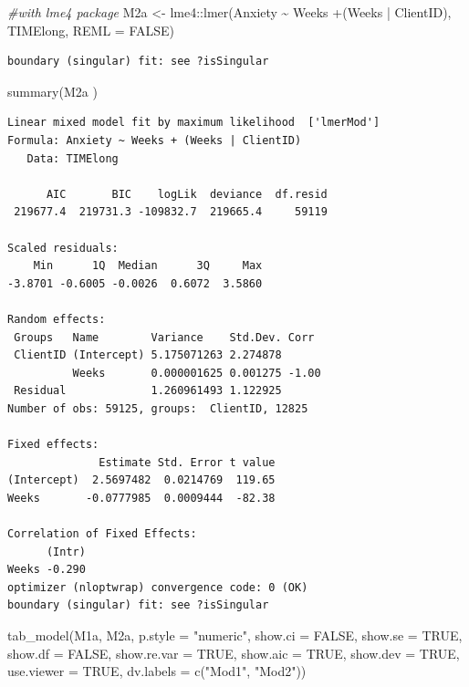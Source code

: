 \documentclass[
  english,
]{book}
\newenvironment{Shaded}{\begin{snugshade}}{\end{snugshade}}
\newcommand{\AttributeTok}[1]{\textcolor[rgb]{0.77,0.63,0.00}{#1}}
\newcommand{\CommentTok}[1]{\textcolor[rgb]{0.56,0.35,0.01}{\textit{#1}}}
\newcommand{\ConstantTok}[1]{\textcolor[rgb]{0.00,0.00,0.00}{#1}}
\newcommand{\FunctionTok}[1]{\textcolor[rgb]{0.00,0.00,0.00}{#1}}
\newcommand{\NormalTok}[1]{#1}
\newcommand{\OtherTok}[1]{\textcolor[rgb]{0.56,0.35,0.01}{#1}}
\newcommand{\SpecialCharTok}[1]{\textcolor[rgb]{0.00,0.00,0.00}{#1}}
\newcommand{\StringTok}[1]{\textcolor[rgb]{0.31,0.60,0.02}{#1}}
\begin{document}
\begin{Shaded}
\begin{Highlighting}[]
\CommentTok{\#with lme4 package}
\NormalTok{M2a }\OtherTok{\textless{}{-}}\NormalTok{ lme4}\SpecialCharTok{::}\FunctionTok{lmer}\NormalTok{(Anxiety }\SpecialCharTok{\textasciitilde{}}\NormalTok{ Weeks }\SpecialCharTok{+}\NormalTok{(Weeks }\SpecialCharTok{|}\NormalTok{ ClientID), TIMElong, }\AttributeTok{REML =} \ConstantTok{FALSE}\NormalTok{)}
\end{Highlighting}
\end{Shaded}

\begin{verbatim}
boundary (singular) fit: see ?isSingular
\end{verbatim}

\begin{Shaded}
\begin{Highlighting}[]
\FunctionTok{summary}\NormalTok{(M2a )}
\end{Highlighting}
\end{Shaded}

\begin{verbatim}
Linear mixed model fit by maximum likelihood  ['lmerMod']
Formula: Anxiety ~ Weeks + (Weeks | ClientID)
   Data: TIMElong

      AIC       BIC    logLik  deviance  df.resid 
 219677.4  219731.3 -109832.7  219665.4     59119 

Scaled residuals: 
    Min      1Q  Median      3Q     Max 
-3.8701 -0.6005 -0.0026  0.6072  3.5860 

Random effects:
 Groups   Name        Variance    Std.Dev. Corr 
 ClientID (Intercept) 5.175071263 2.274878      
          Weeks       0.000001625 0.001275 -1.00
 Residual             1.260961493 1.122925      
Number of obs: 59125, groups:  ClientID, 12825

Fixed effects:
              Estimate Std. Error t value
(Intercept)  2.5697482  0.0214769  119.65
Weeks       -0.0777985  0.0009444  -82.38

Correlation of Fixed Effects:
      (Intr)
Weeks -0.290
optimizer (nloptwrap) convergence code: 0 (OK)
boundary (singular) fit: see ?isSingular
\end{verbatim}

\begin{Shaded}
\begin{Highlighting}[]
\FunctionTok{tab\_model}\NormalTok{(M1a, M2a, }\AttributeTok{p.style =} \StringTok{"numeric"}\NormalTok{, }\AttributeTok{show.ci =} \ConstantTok{FALSE}\NormalTok{, }\AttributeTok{show.se =} \ConstantTok{TRUE}\NormalTok{, }\AttributeTok{show.df =} \ConstantTok{FALSE}\NormalTok{, }\AttributeTok{show.re.var =} \ConstantTok{TRUE}\NormalTok{, }\AttributeTok{show.aic =} \ConstantTok{TRUE}\NormalTok{, }\AttributeTok{show.dev =} \ConstantTok{TRUE}\NormalTok{, }\AttributeTok{use.viewer =} \ConstantTok{TRUE}\NormalTok{, }\AttributeTok{dv.labels =} \FunctionTok{c}\NormalTok{(}\StringTok{"Mod1"}\NormalTok{, }\StringTok{"Mod2"}\NormalTok{))}
\end{Highlighting}
\end{Shaded}
\end{document}
